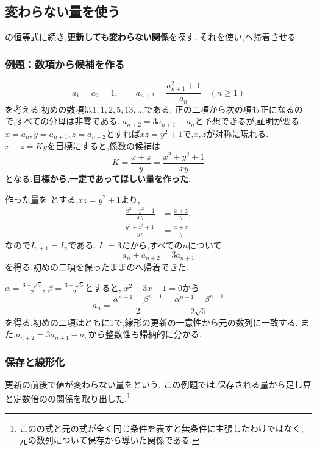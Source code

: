 \subsection{変わらない量を使う}\label{節：不変量から線形の関係}
  の恒等式に続き,\textbf{更新しても変わらない関係}を探す.
  それを使い,へ帰着させる.

  \subsubsection{例題：数項から候補を作る}
  \[
    a_1=a_2=1,\qquad
    a_{n+2}=\frac{a_{n+1}^2+1}{a_n}\quad(n\ge1)
  \]
  を考える.初めの数項は$1,1,2,5,13,\ldots$である.
  正の二項から次の項も正になるので,すべての分母は非零である.
  $a_{n+2}=3a_{n+1}-a_n$と予想できるが,証明が要る.
  $x=a_n,y=a_{n+1},z=a_{n+2}$とすれば$xz=y^2+1$で,$x,z$が対称に現れる.
  $x+z=Ky$を目標にすると,係数の候補は
  \[
    K=\frac{x+z}{y}=\frac{x^2+y^2+1}{xy}
  \]
  となる.\textbf{目標から,一定であってほしい量を作った.}

  作った量を
  \BookMathLayout{\[
    I_n=\frac{a_n^2+a_{n+1}^2+1}{a_na_{n+1}}
  \]}{\[
    \begin{aligned}
      I_n=\frac{a_n^2+a_{n+1}^2+1}{a_na_{n+1}}
    \end{aligned}
  \]}
  とする.$xz=y^2+1$より,
  \[
    \begin{aligned}
      \frac{x^2+y^2+1}{xy}&=\frac{x+z}{y},\\
      \frac{y^2+z^2+1}{yz}&=\frac{x+z}{y}
    \end{aligned}
  \]
  なので$I_{n+1}=I_n$である.
  $I_1=3$だから,すべての$n$について
  \[
    a_n+a_{n+2}=3a_{n+1}
  \]
  を得る.初めの二項を保ったままのへ帰着できた.

  $\alpha=\frac{3+\sqrt5}{2}$, $\beta=\frac{3-\sqrt5}{2}$とすると,
  $x^2-3x+1=0$から
  \[
    a_n=\frac{\alpha^{n-1}+\beta^{n-1}}2
       -\frac{\alpha^{n-1}-\beta^{n-1}}{2\sqrt5}
  \]
  を得る.初めの二項はともに1で,線形の更新の一意性から元の数列に一致する.
  また,$a_{n+2}=3a_{n+1}-a_n$から整数性も帰納的に分かる.

  \subsubsection{保存と線形化}
  更新の前後で値が変わらない量を\textbf{}という.
  この例題では,保存される量から足し算と定数倍のの関係を取り出した.\footnote{このの式と元の式が全く同じ条件を表すと無条件に主張したわけではなく,
  元の数列について保存から導いた関係である.}

